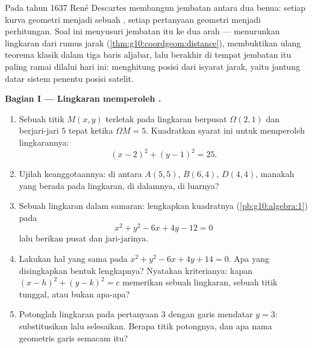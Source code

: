 \begin{problem}
\label{pb:g10:coordgeom:1}
Pada tahun 1637 René Descartes membangun jembatan antara dua benua:
setiap kurva geometri menjadi sebuah \emph{}, setiap
pertanyaan geometri menjadi perhitungan. Soal ini menyusuri jembatan itu
ke dua arah --- menurunkan  lingkaran dari
rumus jarak (\cref{thm:g10:coordgeom:distance}), membuktikan ulang
teorema klasik dalam tiga baris aljabar, lalu berakhir di tempat
jembatan itu paling ramai dilalui hari ini: menghitung posisi
dari isyarat jarak, yaitu jantung datar sistem penentu posisi satelit.

\medskip
\noindent\textbf{Bagian I --- Lingkaran memperoleh .}
\begin{enumerate}
  \item Sebuah titik $M(x, y)$ terletak pada lingkaran berpusat
        $\Omega(2, 1)$ dan berjari-jari $5$ tepat ketika
        $\Omega M = 5$. Kuadratkan syarat ini untuk memperoleh
         lingkarannya:
        \[
        (x - 2)^2 + (y - 1)^2 = 25 .
        \]
  \item Ujilah keanggotaannya: di antara $A(5, 5)$, $B(6, 4)$,
        $D(4, 4)$, manakah yang berada pada lingkaran, di dalamnya, di luarnya?
  \item Sebuah lingkaran dalam samaran: lengkapkan kuadratnya
        (\cref{pb:g10:algebra:1}) pada
        \[
        x^2 + y^2 - 6x + 4y - 12 = 0
        \]
        lalu berikan pusat dan jari-jarinya.
  \item Lakukan hal yang sama pada $x^2 + y^2 - 6x + 4y + 14 = 0$. Apa
        yang disingkapkan bentuk lengkapnya? Nyatakan kriterianya: kapan
        $(x - h)^2 + (y - k)^2 = c$ memerikan sebuah lingkaran, sebuah
        titik tunggal, atau bukan apa-apa?
  \item Potonglah lingkaran pada pertanyaan 3 dengan garis mendatar
        $y = 3$: substitusikan lalu selesaikan. Berapa titik potongnya, dan
        apa nama geometris garis semacam itu?
\end{enumerate}


\end{problem}
